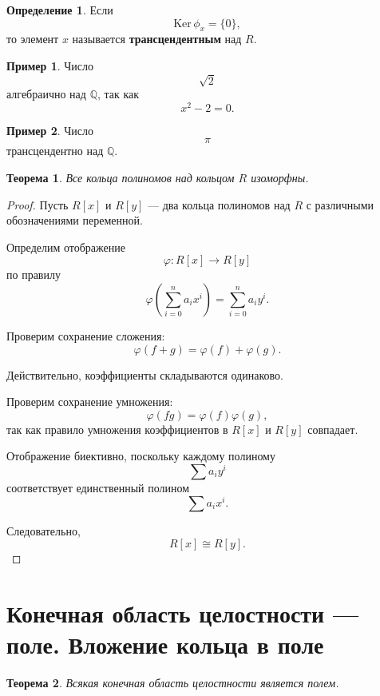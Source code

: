 \documentclass[12pt, a4paper]{article}
\newtheorem{theorem}{Теорема}
\theoremstyle{definition}
\newtheorem{definition}{Определение}
\newtheorem{example}{Пример}
\theoremstyle{remark}
\newcommand{\Ker}{\mathrm{Ker}\,}
\begin{document}
\begin{definition}
	Если
	\[
	\Ker \phi_x=\{0\},
	\]
	то элемент $x$ называется \textbf{трансцендентным} над $R$.
\end{definition}

\begin{example}
	Число
	\[
	\sqrt{2}
	\]
	алгебраично над $\mathbb{Q}$, так как
	\[
	x^2-2=0.
	\]
\end{example}

\begin{example}
	Число
	\[
	\pi
	\]
	трансцендентно над $\mathbb{Q}$.
\end{example}

\begin{theorem}
	Все кольца полиномов над кольцом $R$ изоморфны.
\end{theorem}

\begin{proof}
	Пусть $R[x]$ и $R[y]$ --- два кольца полиномов над $R$
	с различными обозначениями переменной.
	
	Определим отображение
	\[
	\varphi:R[x]\to R[y]
	\]
	по правилу
	\[
	\varphi\left(
	\sum_{i=0}^n a_i x^i
	\right)
	=
	\sum_{i=0}^n a_i y^i.
	\]
	
	Проверим сохранение сложения:
	\[
	\varphi(f+g)=\varphi(f)+\varphi(g).
	\]
	
	Действительно, коэффициенты складываются одинаково.
	
	Проверим сохранение умножения:
	\[
	\varphi(fg)=\varphi(f)\varphi(g),
	\]
	так как правило умножения коэффициентов в $R[x]$
	и $R[y]$ совпадает.
	
	Отображение биективно, поскольку каждому полиному
	\[
	\sum a_i y^i
	\]
	соответствует единственный полином
	\[
	\sum a_i x^i.
	\]
	
	Следовательно,
	\[
	R[x]\cong R[y].
	\]
\end{proof}

\section{Конечная область целостности — поле. Вложение кольца в поле}

\begin{theorem}
	Всякая конечная область целостности является полем.
\end{theorem}
\end{document}
